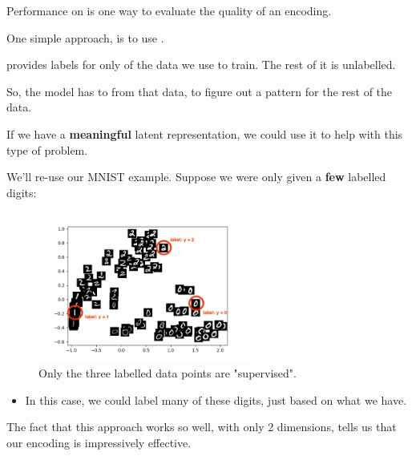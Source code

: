         \begin{concept}
            Performance on  is one way to evaluate the quality of an encoding.
        \end{concept}

        One simple approach, is to use .\\

        \begin{definition}
             provides labels for only  of the data we use to train. The rest of it is unlabelled.

            So, the model has to  from that data, to figure out a pattern for the rest of the data.
        \end{definition}

        If we have a \textbf{meaningful} latent representation, we could use it to help with this type of problem.

        \miniex We'll re-use our MNIST example. Suppose we were only given a \textbf{few} labelled digits:
            

        \begin{figure}[H]
            \centering
            \includegraphics[width=70mm,scale=0.5]{images/autoencoder_images/semi_supervised.png}
            \caption*{Only the three labelled data points are "supervised".}
        \end{figure}

        \begin{itemize}
            \item In this case, we could label many of these digits, just based on what we have.
        \end{itemize}

        The fact that this approach works so well, with only 2 dimensions, tells us that our encoding is impressively effective.

